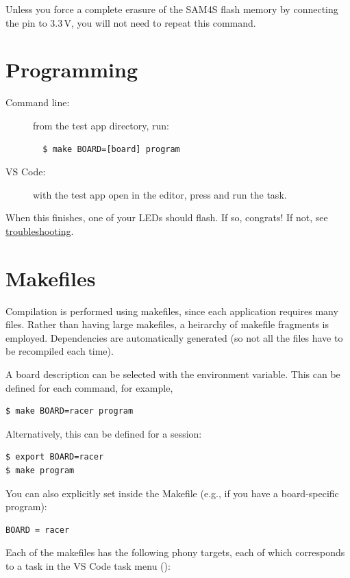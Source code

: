 Unless you force a complete erasure of the SAM4S flash memory by
connecting the  pin to 3.3\,V, you will not need to repeat
this command.

\section{Programming}\label{programming}

\begin{description}
  \item[Command line:] from the test app directory, run:
  \begin{verbatim}
  $ make BOARD=[board] program
  \end{verbatim}

  \item[VS Code:] with the test app open in the editor, press
   and run the  task.
\end{description}

When this finishes, one of your LEDs should flash. If so, congrats! If
not, see \protect\hyperref[troubleshooting]{troubleshooting}.


\section{Makefiles}

Compilation is performed using makefiles, since each application
requires many files.  Rather than having large makefiles, a heirarchy
of makefile fragments is employed.  Dependencies are automatically
generated (so not all the files have to be recompiled each time).

A board description can be selected with the  environment
variable.  This can be defined for each command, for example,
%
\begin{verbatim}
$ make BOARD=racer program
\end{verbatim}


Alternatively, this can be defined for a session:
%
\begin{verbatim}
$ export BOARD=racer
$ make program
\end{verbatim}

You can also explicitly set  inside the Makefile (e.g., if
you have a board-specific program):
%
\begin{verbatim}
BOARD = racer
\end{verbatim}

Each of the makefiles has the following phony targets, each of which
corresponds to a task in the VS Code task menu ():

